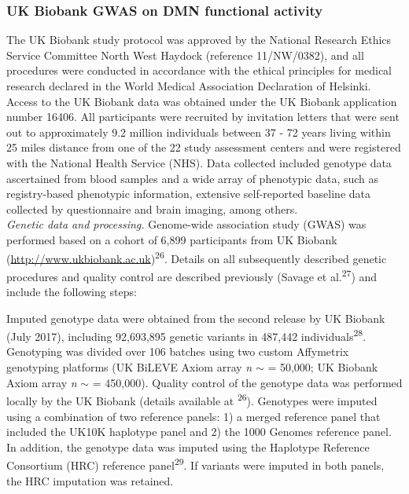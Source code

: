 \begin{refsection}
\subsubsection*{UK Biobank GWAS on DMN functional activity}
The UK Biobank study protocol was approved by the National Research Ethics Service Committee North West Haydock (reference 11/NW/0382), and all procedures were conducted in accordance with the ethical principles for medical research declared in the World Medical Association Declaration of Helsinki. Access to the UK Biobank data was obtained under the UK Biobank application number 16406. All participants were recruited by invitation letters that were sent out to approximately 9.2 million individuals between 37 - 72 years living within 25 miles distance from one of the 22 study assessment centers and were registered with the National Health Service (NHS). Data collected included genotype data ascertained from blood samples and a wide array of phenotypic data, such as registry-based phenotypic information, extensive self-reported baseline data collected by questionnaire and brain imaging, among others.\\

\noindent
\textit{Genetic data and processing.} Genome-wide association study (GWAS) was performed based on a cohort of 6,899 participants from UK Biobank (\url{http://www.ukbiobank.ac.uk})\textsuperscript{26}. Details on all subsequently described genetic procedures and quality control are described previously (Savage et al.\textsuperscript{27}) and include the following steps:

Imputed genotype data were obtained from the second release by UK Biobank (July 2017), including 92,693,895 genetic variants in 487,442 individuals\textsuperscript{28}. Genotyping was divided over 106 batches using two custom Affymetrix genotyping platforms (UK BiLEVE Axiom array \textit{n} $ \sim $ = 50,000; UK Biobank Axiom array \textit{n} $ \sim $ = 450,000). Quality control of the genotype data was performed locally by the UK Biobank (details available at \textsuperscript{26}). Genotypes were imputed using a combination of two reference panels: 1) a merged reference panel that included the UK10K haplotype panel and 2) the 1000 Genomes reference panel. In addition, the genotype data was imputed using the Haplotype Reference Consortium (HRC) reference panel\textsuperscript{29}. If variants were imputed in both panels, the HRC imputation was retained.


\end{refsection}
